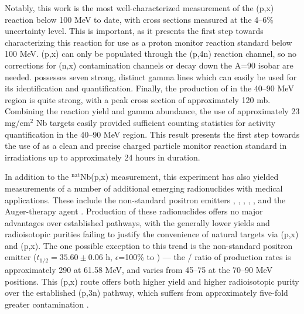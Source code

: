 Notably, this work is the most well-characterized measurement of the (p,x) reaction below 100 MeV to date, with cross sections measured  at the 4--6\% uncertainty level.
This is important, as it presents the first step towards characterizing this reaction for use as a proton monitor reaction standard below 100 MeV.
(p,x) can only be populated through the (p,4n) reaction channel, so no corrections for (n,x) contamination channels or decay down the A=90 isobar are needed.
  possesses seven strong, distinct gamma lines which can easily  be used for its identification and quantification.
Finally, the production of   in the 40--90 MeV region is quite strong, with a peak cross section of approximately 120 mb.
Combining the reaction yield and gamma abundance, the use of approximately 23 mg/cm$^2$ Nb targets easily provided sufficient counting statistics for activity quantification in the 40--90 MeV region.
This result presents the first step towards the use of  as a clean and precise   charged particle monitor reaction standard in irradiations up to approximately 24 hours in duration.





In addition to the $^\text{nat}$Nb(p,x) measurement, this experiment has also yielded measurements of  a number of additional  emerging radionuclides with medical applications.
These include the non-standard positron emitters 
 \cite{PMID:7632762,zweit1996medium,Graves2016,Rosch2014}, 
 \cite{Lewis2003,Bandari2014,mp500671j,Szelecsenyi1993,Aslam2009,Hilgers2003,Szelecsenyi2005,Voyles2017},   \cite{Valdovinos2017,Nickles2003,Qaim2008,QaimSyedM2011,Rosch1993,doi:10.1139/v67-193,levkovski1991cross,Johnson2015,Singh2013,Kiselev1974,Kandil2009}, 
  \cite{Verel2003,Dijkers2009,Dijkers2010,PhysRevC.38.1624,Omara2009},  
 \cite{Busse2002,Radchenko2012},  
and the Auger-therapy agent  \cite{Kovacs1991,Titarenko2011}. 
Production of these radionuclides offers no major advantages over established pathways, with the generally lower yields and radioisotopic purities failing to justify the convenience of natural targets  via   (p,x) and  (p,x). 
The one possible exception to this trend is the non-standard positron emitter  ($t_{1/2}=35.60\pm0.06$ h, $\epsilon$=100\% to  \cite{Bhat1998}) --- the / ratio of production rates is approximately 290 at 61.58 MeV, and varies from 45--75 at the 70--90 MeV positions.
This (p,x) route offers both higher yield and higher radioisotopic purity over the established  (p,3n) pathway, which suffers from approximately five-fold greater   contamination \cite{MICHEL1997153,Ditrói2013}.


